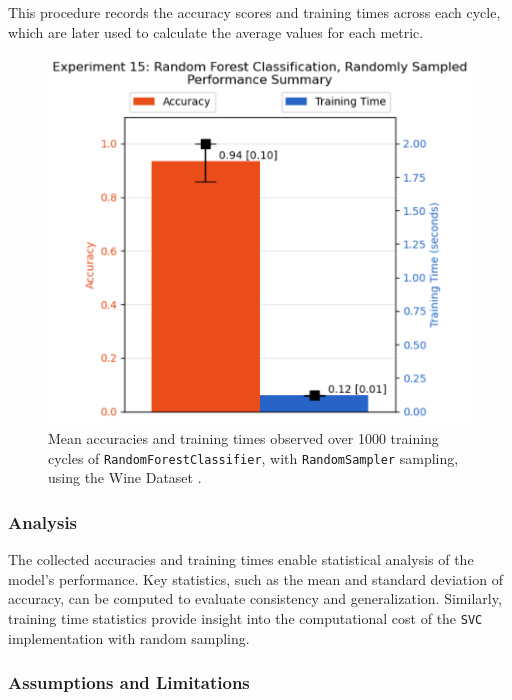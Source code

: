 \documentclass{article}
\theoremstyle{plain}
\theoremstyle{definition}
\theoremstyle{remark}
\begin{document}
This procedure records the accuracy scores and training times across each cycle, which are later used to calculate the average values for each metric.

\begin{figure}[ht]
	\vskip 0.2in
	\begin{center}
		\centerline{\includegraphics[width=\columnwidth]{experiment_15}}
		\caption{Mean accuracies and training times observed over 1000 training cycles of \texttt{RandomForestClassifier}, with \texttt{RandomSampler} sampling, using the Wine Dataset \cite{wine}.}
		\label{experiment_15}
	\end{center}
	\vskip -0.2in
\end{figure}

\subsubsection{Analysis}

The collected accuracies and training times enable statistical analysis of the model's performance. Key statistics, such as the mean and standard deviation of accuracy, can be computed to evaluate consistency and generalization. Similarly, training time statistics provide insight into the computational cost of the \texttt{SVC} implementation with random sampling.

\subsubsection{Assumptions and Limitations}
\end{document}
